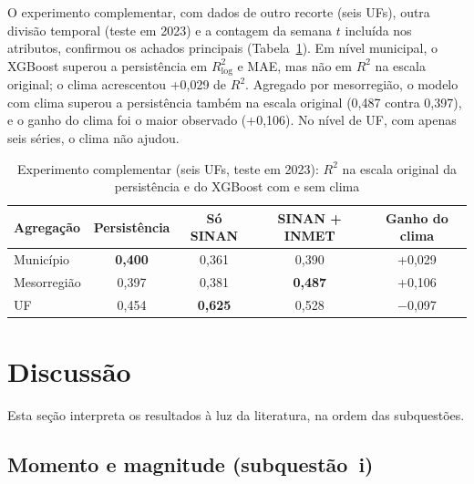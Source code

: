 O experimento complementar, com dados de outro recorte (seis UFs), outra divisão temporal (teste em 2023) e a contagem da semana $t$ incluída nos atributos, confirmou os achados principais (Tabela~\ref{tab:complementar}). Em nível municipal, o XGBoost superou a persistência em $R^2_{\log}$ e MAE, mas não em $R^2$ na escala original; o clima acrescentou +0,029 de $R^2$. Agregado por mesorregião, o modelo com clima superou a persistência também na escala original (0,487 contra 0,397), e o ganho do clima foi o maior observado (+0,106). No nível de UF, com apenas seis séries, o clima não ajudou.

\begin{table}[htb]
\centering
\caption{Experimento complementar (seis UFs, teste em 2023): $R^2$ na escala original da persistência e do XGBoost com e sem clima}
\label{tab:complementar}
\small
\begin{tabular}{|l|c|c|c|c|}
\hline
\textbf{Agregação} & \textbf{Persistência} & \textbf{Só SINAN} & \textbf{SINAN + INMET} & \textbf{Ganho do clima} \\ \hline
Município & \textbf{0,400} & 0,361 & 0,390 & +0,029 \\ \hline
Mesorregião & 0,397 & 0,381 & \textbf{0,487} & +0,106 \\ \hline
UF & 0,454 & \textbf{0,625} & 0,528 & $-$0,097 \\ \hline
\end{tabular}
\end{table}

\section{Discussão}
\label{sec:res_discussao}

Esta seção interpreta os resultados à luz da literatura, na ordem das subquestões.

\subsection{Momento e magnitude (subquestão~i)}

